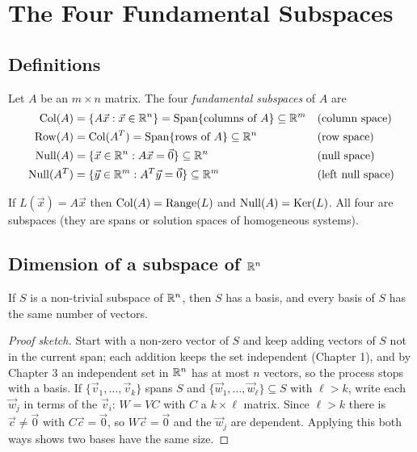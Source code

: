 \chapter{The Four Fundamental Subspaces}

\section{Definitions}

\begin{definition}
Let $A$ be an $m\times n$ matrix. The four \emph{fundamental subspaces} of $A$ are
\begin{align*}
  \operatorname{Col}(A) &= \{A\vec x:\vec x\in\mathbb{R}^n\} = \operatorname{Span}\{\text{columns of }A\}\subseteq\mathbb{R}^m &&\text{(column space)}\\
  \operatorname{Row}(A) &= \operatorname{Col}(A^T) = \operatorname{Span}\{\text{rows of }A\}\subseteq\mathbb{R}^n &&\text{(row space)}\\
  \operatorname{Null}(A) &= \{\vec x\in\mathbb{R}^n : A\vec x=\vec 0\}\subseteq\mathbb{R}^n &&\text{(null space)}\\
  \operatorname{Null}(A^T) &= \{\vec y\in\mathbb{R}^m : A^T\vec y=\vec 0\}\subseteq\mathbb{R}^m &&\text{(left null space)}
\end{align*}
\end{definition}

If $L(\vec x)=A\vec x$ then $\operatorname{Col}(A)=\operatorname{Range}(L)$ and $\operatorname{Null}(A)=\operatorname{Ker}(L)$. All four are subspaces (they
are spans or solution spaces of homogeneous systems).

\section{Dimension of a subspace of $\mathbb{R}^n$}

\begin{theorem}
If $S$ is a non-trivial subspace of $\mathbb{R}^n$, then $S$ has a basis, and every basis of $S$ has the same
number of vectors.
\end{theorem}
\begin{proof}[Proof sketch]
Start with a non-zero vector of $S$ and keep adding vectors of $S$ not in the current span; each
addition keeps the set independent (Chapter 1), and by Chapter 3 an independent set in $\mathbb{R}^n$ has
at most $n$ vectors, so the process stops with a basis. If $\{\vec v_1,\dots,\vec v_k\}$ spans $S$
and $\{\vec w_1,\dots,\vec w_\ell\}\subseteq S$ with $\ell>k$, write each $\vec w_j$ in terms of the
$\vec v_i$: $W = VC$ with $C$ a $k\times\ell$ matrix. Since $\ell>k$ there is $\vec c\neq\vec0$
with $C\vec c=\vec0$, so $W\vec c=\vec0$ and the $\vec w_j$ are dependent. Applying this both ways shows
two bases have the same size.
\end{proof}

